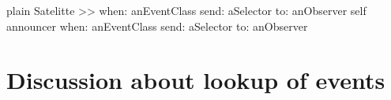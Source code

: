 \documentclass[10pt,twoside,english]{_support/latex/sbabook/sbabook}
\begin{document}
\begin{displaycode}{plain}
Satelitte >> when: anEventClass send: aSelector to: anObserver
	self announcer when: anEventClass send: aSelector to: anObserver
\end{displaycode}
\section{Discussion about lookup of events}

\backmatter



\end{document}
